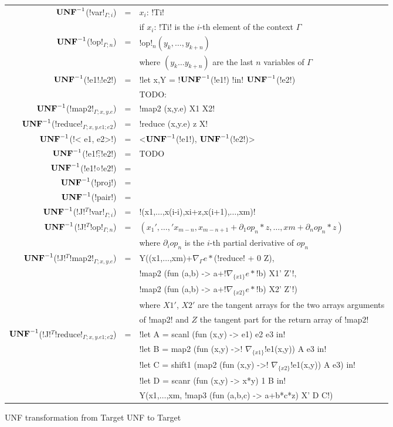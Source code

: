 \begin{figure*}[t]
    \begin{tabular}{r c l}
    $\mathbf{UNF}^{-1}$(!var!$_{\Gamma;i}$) &=& $x_i$: !Ti! \\
    && if $x_i$: !Ti! is the $i$-th element of the context $\Gamma$ \\
    $\mathbf{UNF}^{-1}$(!op!$_{\Gamma;n}$) &=& !op!$_n(y_k,\ldots,y_{k+n})$ \\
    && where $(y_k\ldots y_{k+n})$ are the last $n$ variables of $\Gamma$ \\ 
    $\mathbf{UNF}^{-1}$(!e1!$\comp$!e2!) &=& !let x,Y = !$\mathbf{UNF}^{-1}$(!e1!) !in! $\mathbf{UNF}^{-1}$(!e2!) \\ 
    && TODO: \\ 
    $\mathbf{UNF}^{-1}$(!map2!$_{\Gamma;x,y.e}$) &=& !map2 (x,y.e) X1 X2! \\ 
    $\mathbf{UNF}^{-1}$(!reduce!$_{\Gamma;x,y.e1;e2}$) &=& !reduce (x,y.e) z X! \\ 
    $\mathbf{UNF}^{-1}$(!< e1, e2>!) &=& <$\mathbf{UNF}^{-1}$(!e1!), $\mathbf{UNF}^{-1}$(!e2!)> \\
    $\mathbf{UNF}^{-1}$(!e1!$\widetilde{;}$!e2!) &=& TODO \\
    $\mathbf{UNF}^{-1}$(!e1!$\circ$!e2!) &=& \\
    $\mathbf{UNF}^{-1}$(!proj!) &=& \\
    $\mathbf{UNF}^{-1}$(!pair!) &=& \\
    $\mathbf{UNF}^{-1}$(!J!$^T$!var!$_{\Gamma;i}$) &=& !(x1,$\ldots$,x(i-i),xi+z,x(i+1),$\ldots$,xm)! \\
    $\mathbf{UNF}^{-1}$(!J!$^T$!op!$_{\Gamma;n}$) &=& $(x_1',\ldots,'x_{m-n},x_{m-n+1}+\partial_1op_n*z,\ldots,xm+\partial_nop_n*z)$ \\
    && where $\partial_iop_n$ is the $i$-th partial derivative of $op_n$ \\
    $\mathbf{UNF}^{-1}$(!J!$^T$!map2!$_{\Gamma;x,y.e}$) &=&  Y((x1,$\ldots$,xm)+$\nabla_{\Gamma}e *$(!reduce! + 0 Z),\\
    && !map2 (fun (a,b) -> a+!$\nabla_{\{x1\}}e *$!b) X1' Z'!, \\
    && !map2 (fun (a,b) -> a+!$\nabla_{\{x2\}}e *$!b) X2' Z'!) \\
    && where $X1'$, $X2'$ are the tangent arrays for the two arrays arguments \\
    && of !map2! and $Z$ the tangent part for the return array of !map2! \\
    $\mathbf{UNF}^{-1}$(!J!$^T$!reduce!$_{\Gamma;x,y.e1;e2}$) &=& !let A = scanl (fun (x,y) -> e1) e2 e3 in! \\
    && !let B = map2 (fun (x,y) ->! $\nabla_{\{x1\}}$!e1(x,y)) A e3 in!\\
    && !let C = shift1 (map2 (fun (x,y) ->! $\nabla_{\{x2\}}$!e1(x,y)) A e3) in!\\
    && !let D = scanr (fun (x,y) -> x*y) 1 B in!\\
    && Y(x1,$\ldots$,xm, !map3 (fun (a,b,c) -> a+b*c*z) X' D C!)
    \end{tabular}
    \caption{UNF transformation from Target UNF to Target}
    \label{fig:unf_to_target}
    \end{figure*}